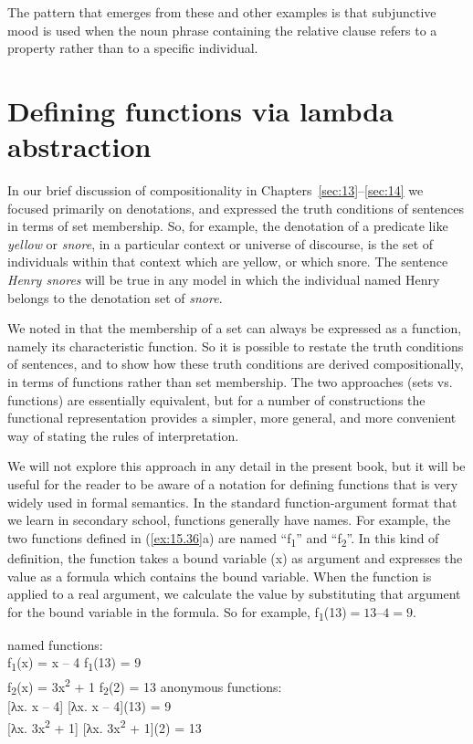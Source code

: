 The pattern that emerges from these and other examples is that subjunctive mood is used when the noun phrase containing the relative clause refers to a property rather than to a specific individual.


\section{Defining functions via lambda abstraction}\label{sec:15.6}

In our brief discussion of compositionality in Chapters~\ref{sec:13}--\ref{sec:14} we focused primarily on denotations, and expressed the truth conditions of sentences in terms of set membership. So, for example, the denotation of a predicate like \textit{yellow} or \textit{snore}, in a particular context or universe of discourse, is the set of individuals within that context which are yellow, or which snore. The sentence \textit{Henry snores} will be true in any model in which the individual named Henry belongs to the denotation set of \textit{snore}.



We noted in  that the membership of a set can always be expressed as a function, namely its characteristic function. So it is possible to restate the truth conditions of sentences, and to show how these truth conditions are derived compositionally, in terms of functions rather than set membership. The two approaches (sets vs. functions) are essentially equivalent, but for a number of constructions the functional representation provides a simpler, more general, and more convenient way of stating the rules of interpretation.



We will not explore this approach in any detail in the present book, but it will be useful for the reader to be aware of a notation for defining functions that is very widely used in formal semantics. In the standard function-argument format that we learn in secondary school, functions generally have names. For example, the two functions defined in (\ref{ex:15.36}a) are named “f\textsubscript{1}” and “f\textsubscript{2}”. In this kind of definition, the function takes a bound variable (x) as argument and expresses the value as a formula which contains the bound variable. When the function is applied to a real argument, we calculate the value by substituting that argument for the bound variable in the formula. So for example, f\textsubscript{1}(13)$ = 13 – 4 = 9$.


\ea \label{ex:15.36}
\ea   named functions:\\
f\textsubscript{1}(x) = x – 4  \hfill f\textsubscript{1}(13) = 9\\
f\textsubscript{2}(x) = 3x\textsuperscript{2} + 1  \hfill f\textsubscript{2}(2) = 13
\ex  anonymous functions:\\
{}[λx. x – 4] \hfill [λx. x – 4](13) = 9\\
{}[λx. 3x\textsuperscript{2} + 1] \hfill [λx. 3x\textsuperscript{2} + 1](2) = 13
\z \z


